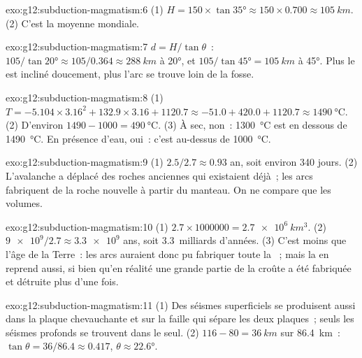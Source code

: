 \begin{solution}{exo:g12:subduction-magmatism:6}
(1) $H = 150 \times \tan\ang{35} \approx 150 \times 0.700 \approx
\qty{105}{km}$. (2) C'est la moyenne mondiale.
\end{solution}

\begin{solution}{exo:g12:subduction-magmatism:7}
$d = H/\tan\theta$~: $105/\tan\ang{20} \approx 105/0.364 \approx
\qty{288}{km}$ à \ang{20}, et $105/\tan\ang{45} = \qty{105}{km}$ à
\ang{45}. Plus le  est incliné doucement, plus l'arc se trouve loin
de la fosse.
\end{solution}

\begin{solution}{exo:g12:subduction-magmatism:8}
(1) $T = -5.104 \times 3.16^2 + 132.9 \times 3.16 + 1120.7 \approx -51.0 +
420.0 + 1120.7 \approx \qty{1490}{\celsius}$. (2) D'environ $1490 - 1000 =
\qty{490}{\celsius}$. (3) À sec, non~: \qty{1300}{\celsius} est en dessous
de \qty{1490}{\celsius}. En présence d'eau, oui~: c'est au-dessus de
\qty{1000}{\celsius}.
\end{solution}

\begin{solution}{exo:g12:subduction-magmatism:9}
(1) $2.5/2.7 \approx 0.93$ an, soit environ 340 jours. (2) L'avalanche a
déplacé des roches anciennes qui existaient déjà~; les arcs fabriquent de
la roche nouvelle à partir du manteau. On ne compare que les volumes.
\end{solution}

\begin{solution}{exo:g12:subduction-magmatism:10}
(1) $2.7 \times \num{1000000} = \qty{2.7e6}{km^3}$. (2) $\num{9e9}/2.7
\approx \num{3.3e9}$ ans, soit 3.3~milliards d'années. (3) C'est moins que
l'âge de la Terre~: les arcs auraient donc pu fabriquer toute la ~; mais la  en reprend aussi, si bien qu'en réalité
une grande partie de la croûte a été fabriquée et détruite plus d'une fois.
\end{solution}

\begin{solution}{exo:g12:subduction-magmatism:11}
(1) Des séismes superficiels se produisent aussi dans la plaque
chevauchante et sur la faille qui sépare les deux plaques~; seuls les
séismes profonds se trouvent dans le  seul.
(2) $116 - 80 = \qty{36}{km}$ sur \qty{86.4}{km}~: $\tan\theta = 36/86.4
\approx 0.417$, $\theta \approx \ang{22.6}$.
\end{solution}

